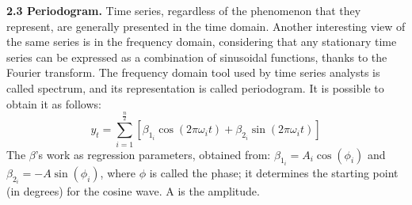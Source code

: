\documentclass{article}
\begin{document}
\textbf{\small 2.3 Periodogram.}
Time series, regardless of the phenomenon that they represent, are generally presented in the time domain. Another interesting view of the same series is in the frequency domain, considering that any stationary time series can be expressed as a combination of sinusoidal functions, thanks to the Fourier transform. The frequency domain tool used by time series analysts is called spectrum, and its representation is called periodogram. It is possible to obtain it as follows:
\begin{equation}
y_t = \sum\limits_{i=1}^{\frac{n}{2}}[\beta_{1_{i}}\cos(2\pi\omega_{i}t) + \beta_{2_{i}}\sin(2\pi\omega_{i}t)]
\end{equation}
The $\beta$'s work as regression parameters, obtained from: $\beta_{1_{i}}=A_{i} \cos(\phi_{i})$ and $\beta_{2_{i}}=-A \sin(\phi_{i})$, where $\phi$ is called the phase; it determines the starting point (in degrees) for the cosine wave. A is the amplitude.
\end{document}
